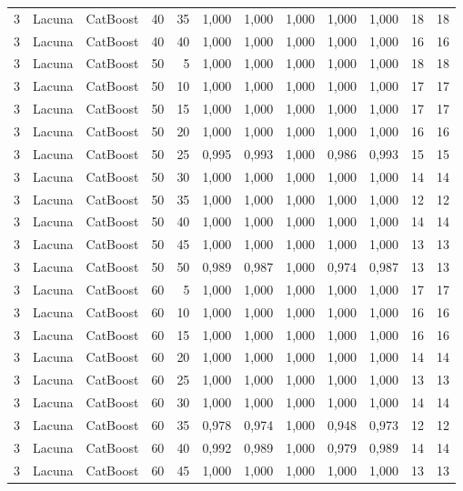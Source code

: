 \begin{longtable}{ccclrrrrrrrr}
3 & Lacuna & CatBoost & 40 & 35 & 1,000 & 1,000 & 1,000 & 1,000 & 1,000 & 18 & 18 \\
3 & Lacuna & CatBoost & 40 & 40 & 1,000 & 1,000 & 1,000 & 1,000 & 1,000 & 16 & 16 \\
3 & Lacuna & CatBoost & 50 & 5 & 1,000 & 1,000 & 1,000 & 1,000 & 1,000 & 18 & 18 \\
3 & Lacuna & CatBoost & 50 & 10 & 1,000 & 1,000 & 1,000 & 1,000 & 1,000 & 17 & 17 \\
3 & Lacuna & CatBoost & 50 & 15 & 1,000 & 1,000 & 1,000 & 1,000 & 1,000 & 17 & 17 \\
3 & Lacuna & CatBoost & 50 & 20 & 1,000 & 1,000 & 1,000 & 1,000 & 1,000 & 16 & 16 \\
3 & Lacuna & CatBoost & 50 & 25 & 0,995 & 0,993 & 1,000 & 0,986 & 0,993 & 15 & 15 \\
3 & Lacuna & CatBoost & 50 & 30 & 1,000 & 1,000 & 1,000 & 1,000 & 1,000 & 14 & 14 \\
3 & Lacuna & CatBoost & 50 & 35 & 1,000 & 1,000 & 1,000 & 1,000 & 1,000 & 12 & 12 \\
3 & Lacuna & CatBoost & 50 & 40 & 1,000 & 1,000 & 1,000 & 1,000 & 1,000 & 14 & 14 \\
3 & Lacuna & CatBoost & 50 & 45 & 1,000 & 1,000 & 1,000 & 1,000 & 1,000 & 13 & 13 \\
3 & Lacuna & CatBoost & 50 & 50 & 0,989 & 0,987 & 1,000 & 0,974 & 0,987 & 13 & 13 \\
3 & Lacuna & CatBoost & 60 & 5 & 1,000 & 1,000 & 1,000 & 1,000 & 1,000 & 17 & 17 \\
3 & Lacuna & CatBoost & 60 & 10 & 1,000 & 1,000 & 1,000 & 1,000 & 1,000 & 16 & 16 \\
3 & Lacuna & CatBoost & 60 & 15 & 1,000 & 1,000 & 1,000 & 1,000 & 1,000 & 16 & 16 \\
3 & Lacuna & CatBoost & 60 & 20 & 1,000 & 1,000 & 1,000 & 1,000 & 1,000 & 14 & 14 \\
3 & Lacuna & CatBoost & 60 & 25 & 1,000 & 1,000 & 1,000 & 1,000 & 1,000 & 13 & 13 \\
3 & Lacuna & CatBoost & 60 & 30 & 1,000 & 1,000 & 1,000 & 1,000 & 1,000 & 14 & 14 \\
3 & Lacuna & CatBoost & 60 & 35 & 0,978 & 0,974 & 1,000 & 0,948 & 0,973 & 12 & 12 \\
3 & Lacuna & CatBoost & 60 & 40 & 0,992 & 0,989 & 1,000 & 0,979 & 0,989 & 14 & 14 \\
3 & Lacuna & CatBoost & 60 & 45 & 1,000 & 1,000 & 1,000 & 1,000 & 1,000 & 13 & 13 \\

\end{longtable}
